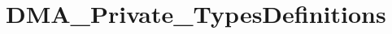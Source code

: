 \hypertarget{group___d_m_a___private___types_definitions}{}\section{D\+M\+A\+\_\+\+Private\+\_\+\+Types\+Definitions}
\label{group___d_m_a___private___types_definitions}
